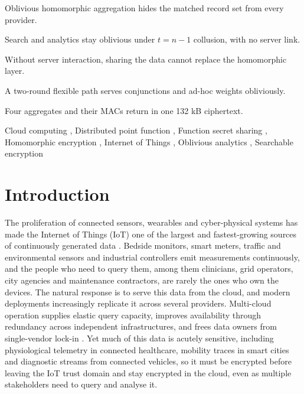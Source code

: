 \documentclass[a4paper,fleqn]{cas-dc}
\begin{document}
\begin{highlights}
\item Oblivious homomorphic aggregation hides the matched record set from
      every provider.
\item Search and analytics stay oblivious under $t=n-1$ collusion, with no
      server link.
\item Without server interaction, sharing the data cannot replace the
      homomorphic layer.
\item A two-round flexible path serves conjunctions and ad-hoc weights
      obliviously.
\item Four aggregates and their MACs return in one 132 kB ciphertext.
\end{highlights}

\begin{keywords}
Cloud computing \sep
Distributed point function \sep
Function secret sharing \sep
Homomorphic encryption \sep
Internet of Things \sep
Oblivious analytics \sep
Searchable encryption
\end{keywords}

\maketitle

\section{Introduction}
\label{sec:intro}

The proliferation of connected sensors, wearables and cyber-physical systems
has made the Internet of Things (IoT) one of the largest and fastest-growing
sources of continuously generated data \citep{atzori2010internet}. Bedside
monitors, smart meters, traffic and environmental sensors and industrial
controllers emit measurements continuously, and the people who need to query
them, among them clinicians, grid operators, city agencies and maintenance
contractors, are rarely the ones who own the devices. The natural response is
to serve this data from the cloud, and modern deployments increasingly
replicate it across several providers. Multi-cloud operation supplies elastic
query capacity, improves availability through redundancy across independent
infrastructures, and frees data owners from single-vendor lock-in
\citep{petcu2013multicloud,grozev2014intercloud}. Yet much of this data is
acutely sensitive, including physiological telemetry in connected healthcare,
mobility traces in smart cities and diagnostic streams from connected
vehicles, so it must be encrypted before leaving the IoT trust domain and stay
encrypted in the cloud, even as multiple stakeholders need to query and
analyse it.
\end{document}
